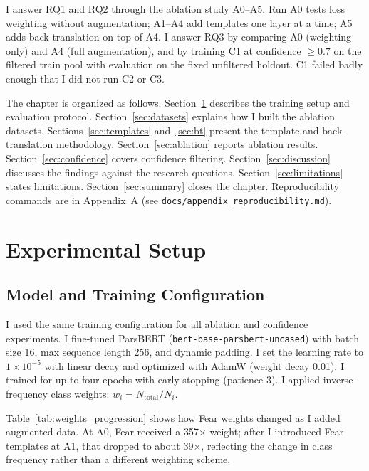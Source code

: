\documentclass[11pt,a4paper]{article}
\begin{document}
I answer RQ1 and RQ2 through the ablation study A0--A5. Run A0 tests loss weighting without augmentation; A1--A4 add templates one layer at a time; A5 adds back-translation on top of A4. I answer RQ3 by comparing A0 (weighting only) and A4 (full augmentation), and by training C1 at confidence $\geq 0.7$ on the filtered train pool with evaluation on the fixed unfiltered holdout. C1 failed badly enough that I did not run C2 or C3.

The chapter is organized as follows. Section~\ref{sec:setup} describes the training setup and evaluation protocol. Section~\ref{sec:datasets} explains how I built the ablation datasets. Sections~\ref{sec:templates} and~\ref{sec:bt} present the template and back-translation methodology. Section~\ref{sec:ablation} reports ablation results. Section~\ref{sec:confidence} covers confidence filtering. Section~\ref{sec:discussion} discusses the findings against the research questions. Section~\ref{sec:limitations} states limitations. Section~\ref{sec:summary} closes the chapter. Reproducibility commands are in Appendix~A (see \texttt{docs/appendix\_reproducibility.md}).

\section{Experimental Setup}
\label{sec:setup}

\subsection{Model and Training Configuration}

I used the same training configuration for all ablation and confidence experiments. I fine-tuned ParsBERT (\texttt{bert-base-parsbert-uncased}) with batch size 16, max sequence length 256, and dynamic padding. I set the learning rate to $1 \times 10^{-5}$ with linear decay and optimized with AdamW (weight decay 0.01). I trained for up to four epochs with early stopping (patience 3). I applied inverse-frequency class weights: $w_i = N_{\text{total}} / N_i$.

Table~\ref{tab:weights_progression} shows how Fear weights changed as I added augmented data. At A0, Fear received a 357$\times$ weight; after I introduced Fear templates at A1, that dropped to about 39$\times$, reflecting the change in class frequency rather than a different weighting scheme.
\end{document}

